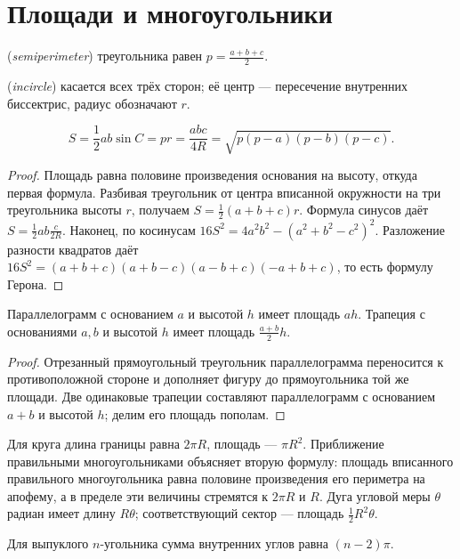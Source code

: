 \section{Площади и многоугольники}
\begin{definition} (\emph{semiperimeter}) треугольника равен \(p=\frac{a+b+c}2\). \par{} (\emph{incircle}) касается всех трёх сторон; её центр — пересечение внутренних биссектрис, радиус обозначают \(r\).\end{definition}
\begin{theorem}
\[
S=\frac12 ab\sin C=pr=\frac{abc}{4R}
=\sqrt{p(p-a)(p-b)(p-c)}.
\]
\end{theorem}
\begin{proof}Площадь равна половине произведения основания на высоту, откуда первая формула. Разбивая треугольник от центра вписанной окружности на три треугольника высоты \(r\), получаем \(S=\frac12(a+b+c)r\). Формула синусов даёт \(S=\frac12ab\frac c{2R}\). Наконец, по косинусам \(16S^2=4a^2b^2-(a^2+b^2-c^2)^2\). Разложение разности квадратов даёт \(16S^2=(a+b+c)(a+b-c)(a-b+c)(-a+b+c)\), то есть формулу Герона.\end{proof}
\begin{theorem}
Параллелограмм с основанием \(a\) и высотой \(h\) имеет площадь \(ah\). Трапеция с основаниями \(a,b\) и высотой \(h\) имеет площадь \(\frac{a+b}2h\).
\end{theorem}
\begin{proof}Отрезанный прямоугольный треугольник параллелограмма переносится к противоположной стороне и дополняет фигуру до прямоугольника той же площади. Две одинаковые трапеции составляют параллелограмм с основанием \(a+b\) и высотой \(h\); делим его площадь пополам.\end{proof}
Для круга длина границы равна \(2\pi R\), площадь — \(\pi R^2\). Приближение правильными многоугольниками объясняет вторую формулу: площадь вписанного правильного многоугольника равна половине произведения его периметра на апофему, а в пределе эти величины стремятся к \(2\pi R\) и \(R\). Дуга угловой меры \(\theta\) радиан имеет длину \(R\theta\); соответствующий сектор — площадь \(\frac12R^2\theta\).
\begin{theorem}
Для выпуклого \(n\)-угольника сумма внутренних углов равна \((n-2)\pi\).
\end{theorem}
